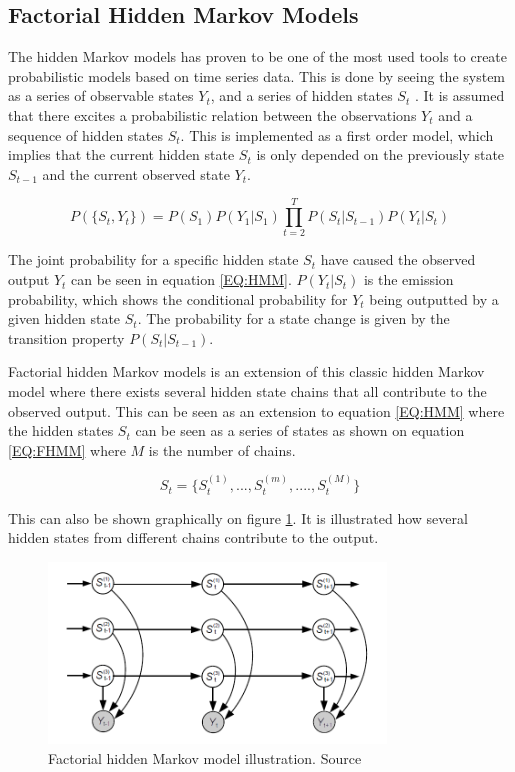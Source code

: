 \subsection{Factorial Hidden Markov Models}
The hidden Markov models has proven to be one of the most used tools to create probabilistic models based on time series data. This is done by seeing the system as a series of observable states $Y_t$, and a series of hidden states $S_t$ \citep{RefWorks:20}. It is assumed that there excites a probabilistic relation between the observations $Y_t$ and a sequence of hidden states $S_t$. This is implemented as a first order model, which implies that the current hidden state $S_t$ is only depended on the previously state $S_{t-1}$ and the current observed state $Y_t$.

\begin{equation}
	P(\{ S_t, Y_t \} ) = P(S_1)P(Y_1 | S_1) \prod_{t=2}^T P(S_t|S_{t-1})P(Y_t|S_t)
	\label{EQ:HMM}
\end{equation}

The joint probability for a specific hidden state $S_t$ have caused the observed output $Y_t$ can be seen in equation \ref{EQ:HMM}. $P(Y_t|S_t)$ is the emission probability, which shows the conditional probability for $Y_t$ being outputted by a given hidden state $S_t$. The probability for a state change is given by the transition property $P(S_t|S_{t-1})$. 

Factorial hidden Markov models is an extension of this classic hidden Markov model where there exists several hidden state chains that all contribute to the observed output. This can be seen as an extension to equation \ref{EQ:HMM} where the hidden states $S_t$ can be seen as a series of states as shown on equation \ref{EQ:FHMM} where $M$ is the number of chains.

\begin{equation}
	S_t = \{ S_t^{(1)}, ..., S_t^{(m)}, ...., S_t^{(M)} \}
	\label{EQ:FHMM}
\end{equation}

This can also be shown graphically on figure \ref{fig:FHMM}. It is illustrated how several hidden states from different chains contribute to the output. 

\begin{figure}[H]
\centering
\includegraphics[width=0.8\textwidth]{billeder/FHMM.png}
\caption{Factorial hidden Markov model illustration. Source \citep{RefWorks:20}}
\label{fig:FHMM}
\end{figure}

